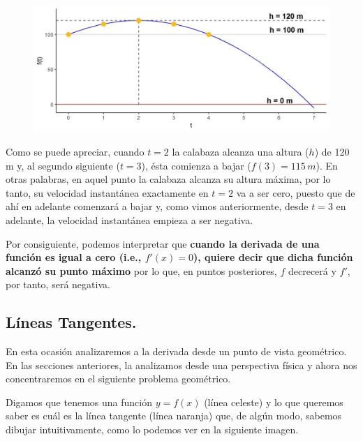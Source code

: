 \documentclass[12pt]{article}
\begin{document}
\begin{figure}[hbt!]
\centering
\includegraphics[scale=0.7]{img/tirar_calabaza_plot_2.jpg}
\end{figure}

Como se puede apreciar, cuando $t = 2$ la calabaza alcanza una altura ($h$) de 120 m y, al segundo siguiente ($t = 3$), ésta comienza a bajar ($f(3) = 115 \, m$). En otras palabras, en aquel punto la calabaza alcanza su altura máxima, por lo tanto, su velocidad instantánea exactamente en $t = 2$ va a ser cero, puesto que de ahí en adelante comenzará a bajar y, como vimos anteriormente, desde $t = 3$ en adelante, la velocidad instantánea empieza a ser negativa.

Por consiguiente, podemos interpretar que \textbf{cuando la derivada de una función es igual a cero (i.e., $f'(x) = 0$), quiere decir que dicha función alcanzó su punto máximo} por lo que, en puntos posteriores, $f$ decrecerá y $f'$, por tanto, será negativa.



\subsection{Líneas Tangentes.}

En esta ocasión analizaremos a la derivada desde un punto de vista geométrico. En las secciones anteriores, la analizamos desde una perspectiva física y ahora nos concentraremos en el siguiente problema geométrico.

Digamos que tenemos una función $y = f(x)$ (línea celeste) y lo que queremos saber es cuál es la línea tangente (línea naranja) que, de algún modo, sabemos dibujar intuitivamente, como lo podemos ver en la siguiente imagen.
\end{document}
